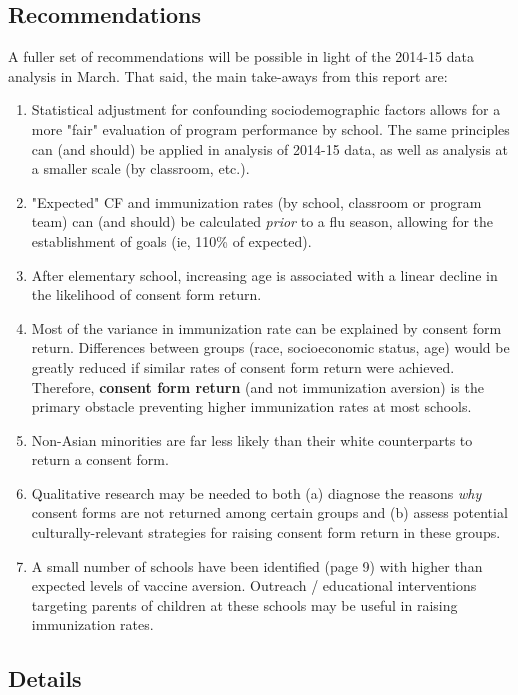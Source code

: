 \subsection*{Recommendations}
A fuller set of recommendations will be possible in light of the 2014-15 data analysis in March.  That said, the main take-aways from this report are: \begin{enumerate}
\item Statistical adjustment for confounding sociodemographic factors allows for a more "fair" evaluation of program performance by school.  The same principles can (and should) be applied in analysis of 2014-15 data, as well as analysis at a smaller scale (by classroom, etc.).  
\item "Expected" CF and immunization rates (by school, classroom or program team) can (and should) be calculated \emph{prior} to a flu season, allowing for the establishment of goals (ie, 110\% of expected).
\item After elementary school, increasing age is associated with a linear decline in the likelihood of consent form return.
\item Most of the variance in immunization rate can be explained by consent form return.  Differences between groups (race, socioeconomic status, age) would be greatly reduced if similar rates of consent form return were achieved.  Therefore, \textbf{consent form return} (and not immunization aversion) is the primary obstacle preventing higher immunization rates at most schools.
\item Non-Asian minorities are far less likely than their white counterparts to return a consent form.
\item Qualitative research may be needed to both (a) diagnose the reasons \emph{why} consent forms are not returned among certain groups and (b) assess potential culturally-relevant strategies for raising consent form return in these groups.  
\item A small number of schools have been identified (page 9) with higher than expected levels of vaccine aversion. Outreach / educational interventions targeting parents of children at these schools may be useful in raising immunization rates.
\end{enumerate}

\begin{center}
\section*{Details}
\end{center}

